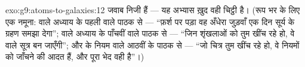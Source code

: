 \begin{solution}{exo:g9:atoms-to-galaxies:12}
जवाब निजी हैं --- यह अभ्यास ख़ुद वही चिट्ठी है। (रूप भर के लिए एक
नमूना:  वाले अध्याय के पहली  वाले पाठक से --- ``फ़र्श पर पड़ा
वह अँधेरा जुड़वाँ एक दिन सूर्य के ग्रहण समझा देगा'';  वाले अध्याय
के पाँचवीं  वाले पाठक से --- ``जिन शृंखलाओं को तुम खींच रहे हो,
वे  वाले सूत्र बन जाएँगी''; और  के नियम वाले आठवीं  के पाठक
से --- ``जो चित्र तुम खींच रहे हो, वे नियमों को जाँचने की आदत हैं, और
पूरा भेद वही है''।)
\end{solution}


